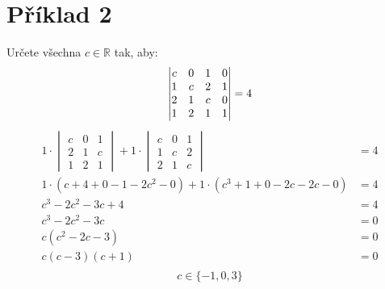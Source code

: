 \newpage
\section*{Příklad 2}
Určete všechna $c \in \mathbb{R}$ tak, aby:
$$
\begin{vmatrix}
    c & 0 & 1 & 0 \\
    1 & c & 2 & 1 \\
    2 & 1 & c & 0 \\
    1 & 2 & 1 & 1
\end{vmatrix}
= 4 \\
$$
\begin{equation*}
    \begin{aligned}
  1 \cdot
  \begin{vmatrix}
    c & 0 & 1 \\
    2 & 1 & c \\
    1 & 2 & 1
  \end{vmatrix}
  + 1 \cdot
  \begin{vmatrix}
    c & 0 & 1 \\
    1 & c & 2 \\
    2 & 1 & c
  \end{vmatrix}
  &= 4 \\
  1 \cdot (c + 4 + 0 - 1 - 2c^2 - 0) +
  1 \cdot (c^3 + 1 + 0 - 2c - 2c - 0)
  &= 4 \\
  c^3 - 2c^2 - 3c + 4 &= 4 \\
  c^3 - 2c^2 - 3c &= 0 \\
  c(c^2 - 2c - 3) &= 0 \\
  c(c - 3)(c + 1) &= 0 \\
    \end{aligned}
\end{equation*}
$$ c \in \{ -1, 0, 3 \} $$